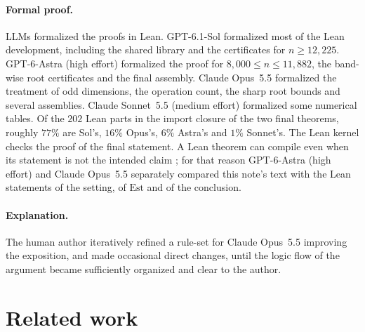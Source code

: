 \documentclass[10pt]{article}
\newcommand{\Est}{\mathrm{Est}}
\begin{document}
\paragraph{Formal proof.}
LLMs formalized the proofs in Lean. GPT-6.1-Sol formalized most of the
Lean development, including the shared library and the certificates for
$n\ge12{,}225$. GPT-6-Astra (high effort) formalized the proof for
$8{,}000\le n\le11{,}882$, the band-wise root certificates and the final
assembly. Claude Opus~5.5 formalized the treatment of odd dimensions, the
operation count, the sharp root bounds and several assemblies. Claude
Sonnet~5.5 (medium effort) formalized some numerical tables. Of the $202$ Lean
parts in the import closure of the two final theorems, roughly $77\%$ are Sol's, $16\%$ Opus's, $6\%$
Astra's and $1\%$ Sonnet's. The Lean kernel checks the proof of the final
statement. A Lean theorem can compile even when its statement is not the
intended claim \citep[cf.][Sections~1 and~4]{ilin-nugent-2026}; for that reason GPT-6-Astra (high
effort) and Claude Opus~5.5 separately compared this note's text with the Lean
statements of the setting, of $\Est$ and of the conclusion.

\paragraph{Explanation.}
The human author iteratively refined a rule-set for Claude Opus~5.5 improving 
the exposition, and made occasional direct changes, until the logic flow of 
the argument became sufficiently organized and clear to the author.
 

\section{Related work}
\end{document}
